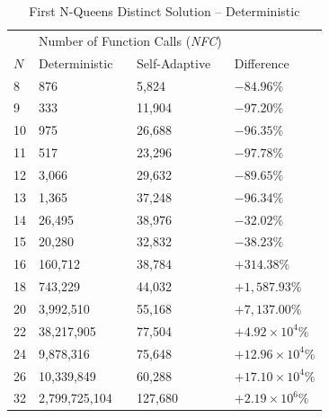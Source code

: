 \documentclass[conference]{IEEEtran}
\begin{document}
\begin{table}
\centering
\caption{First N-Queens Distinct Solution -- Deterministic}
{\renewcommand{\arraystretch}{1.2}
\begin{tabular}{|l|l|l|l|} \hline
&       \multicolumn{2}{c|}{Number of Function Calls (\emph{NFC})}& \\ \cline{2-3}
$N$&    Deterministic&  Self-Adaptive&  Difference \\ \hline
8&      876&            5,824&          $ -84.96\% $ \\ \hline
9&      333&            11,904&         $ -97.20\% $ \\ \hline
10&     975&            26,688&         $ -96.35\% $ \\ \hline
11&     517&            23,296&         $ -97.78\% $ \\ \hline
12&     3,066&          29,632&         $ -89.65\% $ \\ \hline
13&     1,365&          37,248&         $ -96.34\% $ \\ \hline
14&     26,495&         38,976&         $ -32.02\% $ \\ \hline
15&     20,280&         32,832&         $ -38.23\% $ \\ \hline
16&     160,712&        38,784&         $ +314.38\% $ \\ \hline
18&     743,229&        44,032&         $ +1,587.93\% $ \\ \hline
20&     3,992,510&      55,168&         $ +7,137.00\% $ \\ \hline
22&     38,217,905&     77,504&         $ +4.92\times10^{4}\% $ \\ \hline
24&     9,878,316&      75,648&         $ +12.96\times10^{4}\% $ \\ \hline
26&     10,339,849&     60,288&         $ +17.10\times10^{4}\% $ \\ \hline
32&     2,799,725,104&  127,680&        $ +2.19\times10^{6}\% $ \\ \hline
\end{tabular}}
\label{table:firstsol_deterministic}
\end{table}

\end{document}
